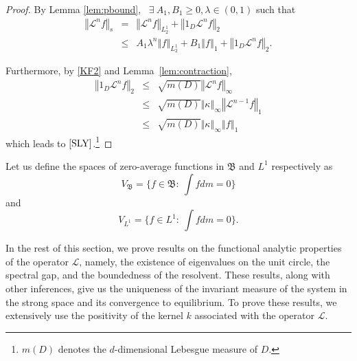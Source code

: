 \documentclass{amsart}
\newcommand\cL{{\mathcal L}}
\newcommand\fB{{\mathfrak B}}
\newcommand{\norm}[1]{\left\Vert#1\right\Vert}
\begin{document}
\begin{proof}
By Lemma \ref{lem:pbound}, \ $\exists\  A_{1},B_{1}\geq 0,\lambda \in (0,1)$
such that%
\begin{eqnarray*}
\norm{\cL^{n}f}_{s}
&=&\norm{\cL^{n}f}_{L_{2}^{1}}+\norm{1_{D}\cL^{n}f}_{{2}} \\
&\leq &A_{1}\lambda ^{n}\norm{f} _{L_{2}^{1}}+B_{1}\norm{
f}_{{1}}+\norm{1_{D}\cL^{n}f}_{{2}}.
\end{eqnarray*}

Furthermore, by \eqref{KF2} and Lemma~\ref{lem:contraction}, 
\begin{eqnarray*}
\norm{1_{D}\cL^{n}f}_{{2}} &\leq &\sqrt{m(D)}\norm{\cL^{n}f}_{\infty } \\
&\leq &\sqrt{m(D)}\norm{\kappa}_{\infty }\norm{\cL^{n-1}f}_{{1}} \\
&\leq &\sqrt{m(D)}\norm{\kappa}_{\infty }\norm{f}_{{1}}
\end{eqnarray*}%
which leads to $\eqref{SLY}$.\footnote{\(m(D)\) denotes the $d$-dimensional Lebesgue measure of \(D\). }
\end{proof}
Let us define the spaces of zero-average functions in \(\fB\) and \(L^1\) respectively as 
\begin{equation} \label{V_B}
    V_{\fB}=\{f\in \fB:~\int fdm=0\}
\end{equation}
and 
\begin{equation}\label{V_s}
    V_{L^1}=\{f\in L^1:~\int fdm=0\}.
\end{equation}

In the rest of this section, we prove results on the functional analytic properties of the operator \(\cL\), namely, the existence of eigenvalues on the unit circle, the spectral gap, and the boundedness of the resolvent. These results, along with other inferences, give us the uniqueness of the invariant measure of the system in the strong space and its convergence to equilibrium. To prove these results, we extensively use the positivity of the kernel \(k\) associated with the operator \(\cL\). 
\end{document}
